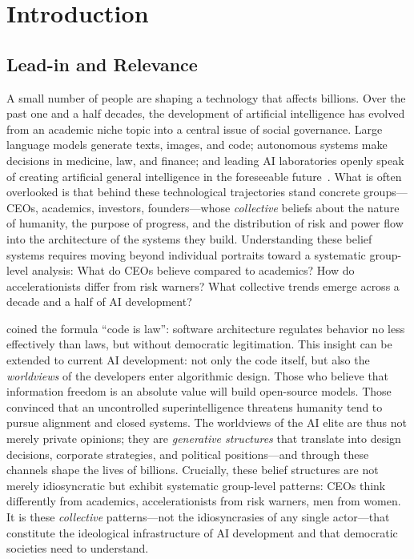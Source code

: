 \documentclass[12pt,a4paper]{article}
\begin{document}
\clearpage
{}
{}
\tableofcontents
\clearpage
{}



\section{Introduction}
\label{sec:einleitung}

\subsection{Lead-in and Relevance}
\label{sec:einleitung:relevanz}

A small number of people are shaping a technology that affects billions. Over the past one and a half decades, the development of artificial intelligence has evolved from an academic niche topic into a central issue of social governance. Large language models generate texts, images, and code; autonomous systems make decisions in medicine, law, and finance; and leading AI laboratories openly speak of creating artificial general intelligence in the foreseeable future~\citep{OpenAI2023Charter, AnthropicCoreViews2023, Bengio2024}. What is often overlooked is that behind these technological trajectories stand concrete groups---CEOs, academics, investors, founders---whose \emph{collective} beliefs about the nature of humanity, the purpose of progress, and the distribution of risk and power flow into the architecture of the systems they build. Understanding these belief systems requires moving beyond individual portraits toward a systematic group-level analysis: What do CEOs believe compared to academics? How do accelerationists differ from risk warners? What collective trends emerge across a decade and a half of AI development?

\citet{Lessig1999} coined the formula ``code is law'': software architecture regulates behavior no less effectively than laws, but without democratic legitimation. This insight can be extended to current AI development: not only the code itself, but also the \emph{worldviews} of the developers enter algorithmic design. Those who believe that information freedom is an absolute value will build open-source models. Those convinced that an uncontrolled superintelligence threatens humanity tend to pursue alignment and closed systems. The worldviews of the AI elite are thus not merely private opinions; they are \emph{generative structures} that translate into design decisions, corporate strategies, and political positions---and through these channels shape the lives of billions. Crucially, these belief structures are not merely idiosyncratic but exhibit systematic group-level patterns: CEOs think differently from academics, accelerationists from risk warners, men from women. It is these \emph{collective} patterns---not the idiosyncrasies of any single actor---that constitute the ideological infrastructure of AI development and that democratic societies need to understand.
\end{document}
